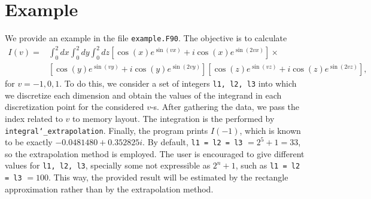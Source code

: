 \documentclass[12pt,a4paper]{article}
\begin{document}
\section{Example}
We provide an example in the file {\tt example.F90}. The objective is to calculate
\begin{equation}
\begin{split}
I(v) = & \int_{0}^{2}dx\int_{0}^{2}dy\int_{0}^{2}dz \left[\cos(x)e^{\sin(vx)}+i \cos(x)e^{\sin(2vx)}\right]\times \\
&\left[\cos(y)e^{\sin(vy)}+i \cos(y)e^{\sin(2vy)}\right]\left[\cos(z)e^{\sin(vz)}+i \cos(z)e^{\sin(2vz)}\right],
\end{split}
\end{equation}
for $v=-1, 0, 1$. To do this, we consider a set of integers {\tt l1, l2, l3} into which we discretize each dimension and obtain the values of the integrand in each discretization point for the considered $v$-s. After gathering the data, we pass the index related to $v$ to memory layout. The integration is the performed by {\tt integral\char`_extrapolation}. Finally, the program prints $I(-1)$, which is known to be exactly $-0.0481480 +0.352825i$. By default, {\tt l1 = l2 = l3} $= 2^5 +1 = 33$, so the extrapolation method is employed. The user is encouraged to give different values for {\tt l1, l2, l3}, specially some not expressible as $2^n + 1$, such as {\tt l1 = l2 = l3} $=100$. This way, the provided result will be estimated by the rectangle approximation rather than by the extrapolation method.


\end{document}
